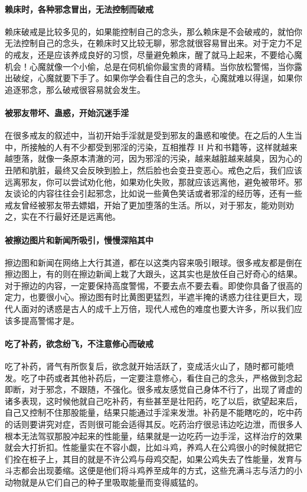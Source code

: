 \paragraph{赖床时，各种邪念冒出，无法控制而破戒}

赖床破戒是比较多见的，如果能控制自己的念头，那么赖床是不会破戒的，就怕你无法控制自己的念头，在赖床时又比较无聊，邪念就很容易冒出来。对于定力不足的戒友，还是应该养成良好的习惯，尽量避免赖床，醒了就马上起来，不要给心魔机会！心魔就像一个小偷，总是在伺机偷你最宝贵的肾精。当你放松警惕，当你露出破绽，心魔就要下手了。如果你学会看住自己的念头，心魔就难以得逞，如果你追逐邪念，那么破戒很容易就会发生。

\paragraph{被邪友带坏、蛊惑，开始沉迷手淫}

在很多戒友的叙述中，当初开始手淫就是受到邪友的蛊惑和唆使。在之后的人生当中，所接触的人有不少都受到邪淫的污染，互相推荐 H 片和书籍等，这样就越来越堕落，就像一条原本清澈的河，因为邪淫的污染，越来越脏越来越臭，因为心的丑陋和肮脏，最终又会反映到脸上，然后脸也会变丑变恶心。戒色之后，我们应该远离邪友，你可以尝试劝化他，如果劝化失败，那就应该远离他，避免被带坏。邪友谈论的内容往往会引起邪念，比如说一些黄色笑话或者邪淫的经历等，还有一些戒友曾经被邪友带去嫖娼，开始了更加堕落的生活。所以，对于邪友，能劝则劝之，实在不行最好还是远离他。

\paragraph{被擦边图片和新闻所吸引，慢慢深陷其中}

擦边图和新闻在网络上大行其道，都在以这类内容来吸引眼球。很多戒友都是倒在擦边图上，有的则在擦边新闻上栽了大跟头，这其实也是放任自己好奇心的结果。对于擦边的内容，一定要保持高度警惕，不要去点不要去看。即使你具备了很高的定力，也要很小心。擦边图有时比黄图更猛烈，半遮半掩的诱惑力往往更巨大，现代人面对的诱惑是古人的成千上万倍，现代人戒色的难度也要大许多，所以我们应该多提高警惕才是。

\paragraph{吃了补药，欲念纷飞，不注意修心而破戒}

吃了补药，肾气有所恢复后，欲念就开始活跃了，变成活火山了，随时都可能喷发。吃了中药或者其他补药后，一定要注意修心，看住自己的念头，严格做到念起即断，对于邪念，不跟随，不强化。很多戒友感觉自己身体不行了，出现了肾虚的诸多表现，这时候他就自己吃补药，有些甚至是壮阳药，吃了以后，欲望起来后，自己又控制不住那股能量，结果只能通过手淫来发泄。补药是不能瞎吃的，吃中药的话则要讲究对症，否则很可能会适得其反。吃药治疗很忌讳边吃边泄，而很多人根本无法驾驭那股冲起来的性能量，结果就是一边吃药一边手淫，这样治疗的效果就会大打折扣。性能量实在不容小觑，比如斗鸡，养鸡人在公鸡很小的时候就把它们拴在桩子上，其目的就是不许公鸡与母鸡交配，如果公鸡失去了性能量，发育与斗志都会出现萎缩。这便是他们将斗鸡养至成年的方式，这些充满斗志与活力的小动物就是从它们自己的种子里吸取能量而变得威猛的。

